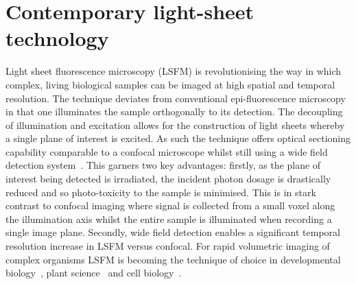 \ifpdf
    \graphicspath{{Chapters/literature/Figs/Raster/}{Chapters/literature/Figs/PDF/}{Chapters/literature/Figs/}}
\else
    \graphicspath{{Chapters/literature/Figs/Vector/}{Chapters/Figs/}}
\fi


\chapter{Contemporary light-sheet technology}%

Light sheet fluorescence microscopy (LSFM) is revolutionising the way in which complex, living biological samples can be imaged at high spatial and temporal resolution. %
The technique deviates from conventional epi-fluorescence microscopy in that one illuminates the sample orthogonally to its detection.
The decoupling of illumination and excitation allows for the construction of light sheets whereby a single plane of interest is excited.  %
As such the technique offers optical sectioning capability comparable to a confocal microscope whilst still using a wide field detection system~\cite{siedentpf_uber_1903,voie_orthogonal-plane_1993,huisken_optical_2004-1}. %
This garners two key advantages: firstly, as the plane of interest being detected is irradiated, the incident photon dosage is drastically reduced and so photo-toxicity to the sample is minimised.%
This is in stark contrast to confocal imaging where signal is collected from a small voxel along the illumination axis whilst the entire sample is illuminated when recording a single image plane.
Secondly, wide field detection enables a significant temporal resolution increase in LSFM versus confocal.
For rapid volumetric imaging of complex organisms LSFM is becoming the technique of choice in developmental biology~\cite{keller_fast_2010,verveer_high-resolution_2007,mickoleit_high-resolution_2014,icha_using_2016,keller_visualizing_2015,ichikawa_live_2014}, plant science~\cite{wangenheim_rules_2016} and cell biology~\cite{capoulade_quantitative_2011,cella_zanacchi_live-cell_2011}.

